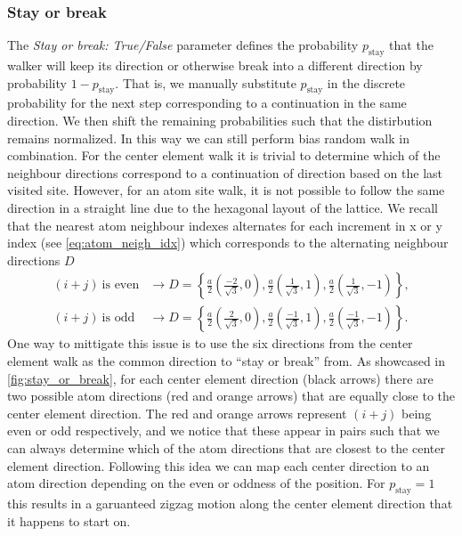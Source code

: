 \begin{figure}[H]
     \label{fig:bias_prob}
\end{figure}


\subsubsection{Stay or break}
The \textit{Stay or break: True/False} parameter defines the probability
$p_{\text{stay}}$ that the walker will keep its direction or otherwise break
into a different direction by probability $1-p_{\text{stay}}$. That is, we
manually substitute $p_{\text{stay}}$ in the discrete probability for the next
step corresponding to a continuation in the same direction. We then  shift the
remaining probabilities such that the distirbution remains normalized. In this
way we can still perform bias random walk in combination. For the center element
walk it is trivial to determine which of the neighbour directions correspond to
a continuation of direction based on the last visited site. However, for an atom site walk, it is not possible to follow the same direction in a straight line due to the hexagonal layout of the lattice. We recall that the
nearest atom neighbour indexes alternates for each increment in x or y index (see \cref{eq:atom_neigh_idx}) which corresponds to the alternating neighbour directions $D$
\begin{align*}
  (i + j) \ \text{is even} &\rightarrow D = \left\{ \frac{a}{2}\left(\frac{-2}{\sqrt{3}}, 0\right), \frac{a}{2}\left(\frac{1}{\sqrt{3}}, 1\right), \frac{a}{2}\left(\frac{1}{\sqrt{3}}, -1\right)\right\}, \\
  (i + j) \ \text{is odd} &\rightarrow D = \left\{ \frac{a}{2}\left(\frac{2}{\sqrt{3}}, 0\right), \frac{a}{2}\left(\frac{-1}{\sqrt{3}}, 1\right), \frac{a}{2}\left(\frac{-1}{\sqrt{3}}, -1\right)\right\}.
\end{align*}
One way to mittigate this issue is to use the six directions from the center element walk as the common direction to ``stay or break'' from. As showcased in \cref{fig:stay_or_break}, for each center element direction (black arrows) there are two possible atom directions (red and orange arrows) that are equally close to the center element direction. The red and orange arrows represent $(i+j)$ being even or odd respectively, and we notice that these appear in pairs such that we can always determine which of the atom directions that are closest to the center element direction. Following this idea we can map each center direction to an atom direction depending on the even or oddness of the position. For $p_{\text{stay}} = 1$ this results in a garuanteed zigzag motion along the center element direction that it happens to start on. 

